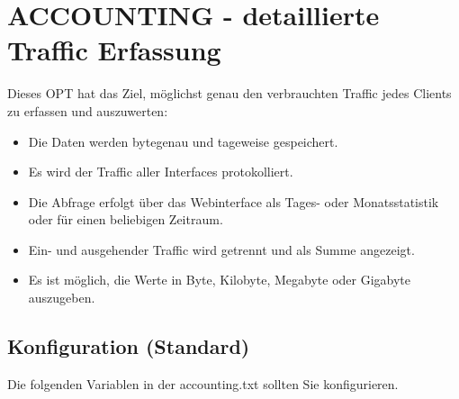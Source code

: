 {
\section {ACCOUNTING - detaillierte Traffic Erfassung}
}

Dieses OPT hat das Ziel, möglichst genau den verbrauchten Traffic jedes Clients zu erfassen und auszuwerten:
\begin{itemize}
\item Die Daten werden bytegenau und tageweise gespeichert.
\item Es wird der Traffic aller Interfaces protokolliert.
\item Die Abfrage erfolgt über das Webinterface als Tages- oder Monatsstatistik oder für einen beliebigen Zeitraum.
\item Ein- und ausgehender Traffic wird getrennt und als Summe angezeigt.
\item Es ist möglich, die Werte in Byte, Kilobyte, Megabyte oder Gigabyte auszugeben.
\end{itemize}

\subsection{Konfiguration (Standard)}
Die folgenden Variablen in der accounting.txt sollten Sie konfigurieren.

